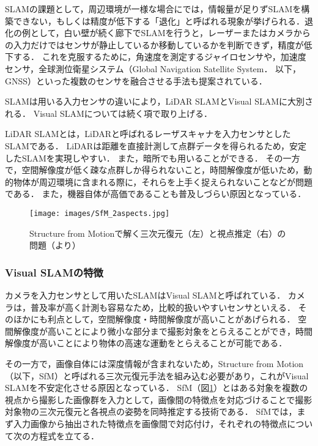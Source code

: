 SLAMの課題として，周辺環境が一様な場合にでは，情報量が足りずSLAMを構築できない，もしくは精度が低下する「退化」と呼ばれる現象が挙げられる\cite{tomono正裕2020}．退化の例として，白い壁が続く廊下でSLAMを行うと，レーザーまたはカメラからの入力だけではセンサが静止しているか移動しているかを判断できず，精度が低下する．
これを克服するために，角速度を測定するジャイロセンサや，加速度センサ，全球測位衛星システム（Global Navigation Satellite System． 以下，GNSS）といった複数のセンサを融合させる手法も提案されている．

SLAMは用いる入力センサの違いにより，LiDAR SLAMとVisual SLAMに大別される\cite{tomono正裕2020}．
Visual SLAMについては続く項で取り上げる．

LiDAR SLAMとは，LiDARと呼ばれるレーザスキャナを入力センサとしたSLAMである．
LiDARは距離を直接計測して点群データを得られるため，安定したSLAMを実現しやすい．
また，暗所でも用いることができる．
その一方で，空間解像度が低く疎な点群しか得られないこと，時間解像度が低いため，動的物体が周辺環境に含まれる際に，それらを上手く捉えられないことなどが問題である．
また，機器自体が高価であることも普及しづらい原因となっている\cite{tomono正裕2020}．

\begin{figure}[b]
    \centering
    \texttt{[image: images/SfM\_2aspects.jpg]}
    \caption[Structure from Motionで解く三次元復元と視点推定の問題]{Structure from Motionで解く三次元復元（左）と視点推定（右）の問題（\cite{sfm_shalaby2017algorithms}より）}
    \label{fig:sfm_figure}
\end{figure}

\subsubsection{Visual SLAMの特徴}\label{subsec:character_of_visual_SLAM}
カメラを入力センサとして用いたSLAMはVisual SLAMと呼ばれている．
カメラは，普及率が高く計測も容易なため，比較的扱いやすいセンサといえる．
そのほかにも利点として，空間解像度・時間解像度が高いことがあげられる．
空間解像度が高いことにより微小な部分まで撮影対象をとらえることができ，時間解像度が高いことにより物体の高速な運動をとらえることが可能である．

その一方で，画像自体には深度情報が含まれないため，Structure from Motion（以下，SfM）と呼ばれる三次元復元手法を組み込む必要があり，これがVisual SLAMを不安定化させる原因となっている\cite{tomono正裕2020}．
SfM（図\ref{fig:sfm_figure}）とはある対象を複数の視点から撮影した画像群を入力として，画像間の特徴点を対応づけることで撮影対象物の三次元復元と各視点の姿勢を同時推定する技術である\cite{中村恭之2017-08-05}．
SfMでは，まず入力画像から抽出された特徴点を画像間で対応付け，それぞれの特徴点について次の方程式を立てる．

